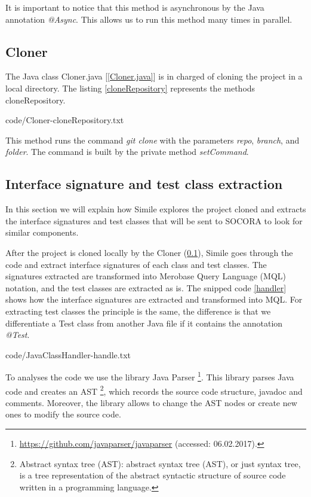 It is important to notice that this method is asynchronous by the Java annotation \emph{@Async}. This allows us to run this method many times in parallel.

\subsection{Cloner}
\label{simile:cloner}
The Java class Cloner.java [\ref{Cloner.java}] is in charged of cloning the project in a local directory. The listing \ref{cloneRepository} represents the methods cloneRepository.


{code/Cloner-cloneRepository.txt}

This method runs the command \emph{git clone} with the parameters \emph{repo}, \emph{branch}, and \emph{folder}. The command is built by the private method \emph{setCommand}.

\subsection{Interface signature and test class extraction}
\label{simile:code-analysis}
In this section we will explain how Simile explores the project cloned and extracts the interface signatures and test classes that will be sent to SOCORA to look for similar components.

After the project is cloned locally by the Cloner (\ref{simile:cloner}), Simile goes through the code and extract interface signatures of each class and test classes. The signatures extracted are transformed into Merobase Query Language (MQL) notation, and the test classes are extracted as is. The snipped code \ref{handler} shows how the interface signatures are extracted and transformed into MQL. For extracting test classes the principle is the same, the difference is that we differentiate a Test class from another Java file if it contains the annotation \emph{@Test}.


{code/JavaClassHandler-handle.txt}

To analyses the code we use the library Java Parser \footnote{\url{https://github.com/javaparser/javaparser} (accessed: 06.02.2017).}. This library parses Java code and creates an AST \footnote{Abstract syntax tree (AST): abstract syntax tree (AST), or just syntax tree, is a tree representation of the abstract syntactic structure of source code written in a programming language.}, which records the source code structure, javadoc and comments. Moreover, the library allows to change the AST nodes or create new ones to modify the source code.

